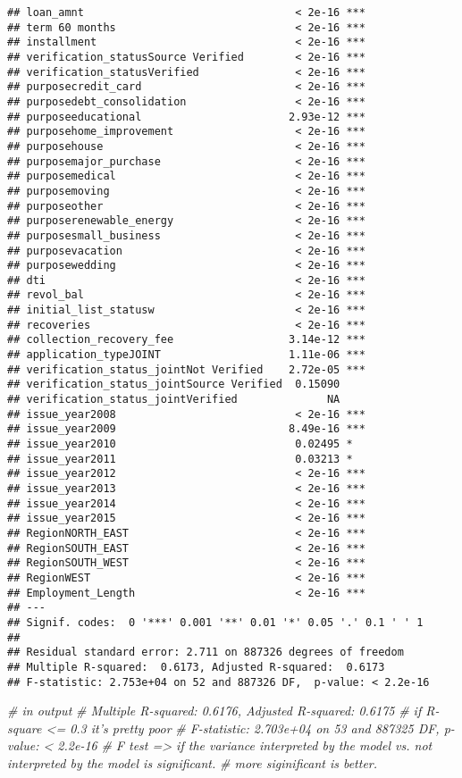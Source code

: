 \documentclass[]{article}
\newenvironment{Shaded}{\begin{snugshade}}{\end{snugshade}}
\newcommand{\CommentTok}[1]{\textcolor[rgb]{0.56,0.35,0.01}{\textit{#1}}}
\begin{document}
\begin{verbatim}
## loan_amnt                                 < 2e-16 ***
## term 60 months                            < 2e-16 ***
## installment                               < 2e-16 ***
## verification_statusSource Verified        < 2e-16 ***
## verification_statusVerified               < 2e-16 ***
## purposecredit_card                        < 2e-16 ***
## purposedebt_consolidation                 < 2e-16 ***
## purposeeducational                       2.93e-12 ***
## purposehome_improvement                   < 2e-16 ***
## purposehouse                              < 2e-16 ***
## purposemajor_purchase                     < 2e-16 ***
## purposemedical                            < 2e-16 ***
## purposemoving                             < 2e-16 ***
## purposeother                              < 2e-16 ***
## purposerenewable_energy                   < 2e-16 ***
## purposesmall_business                     < 2e-16 ***
## purposevacation                           < 2e-16 ***
## purposewedding                            < 2e-16 ***
## dti                                       < 2e-16 ***
## revol_bal                                 < 2e-16 ***
## initial_list_statusw                      < 2e-16 ***
## recoveries                                < 2e-16 ***
## collection_recovery_fee                  3.14e-12 ***
## application_typeJOINT                    1.11e-06 ***
## verification_status_jointNot Verified    2.72e-05 ***
## verification_status_jointSource Verified  0.15090    
## verification_status_jointVerified              NA    
## issue_year2008                            < 2e-16 ***
## issue_year2009                           8.49e-16 ***
## issue_year2010                            0.02495 *  
## issue_year2011                            0.03213 *  
## issue_year2012                            < 2e-16 ***
## issue_year2013                            < 2e-16 ***
## issue_year2014                            < 2e-16 ***
## issue_year2015                            < 2e-16 ***
## RegionNORTH_EAST                          < 2e-16 ***
## RegionSOUTH_EAST                          < 2e-16 ***
## RegionSOUTH_WEST                          < 2e-16 ***
## RegionWEST                                < 2e-16 ***
## Employment_Length                         < 2e-16 ***
## ---
## Signif. codes:  0 '***' 0.001 '**' 0.01 '*' 0.05 '.' 0.1 ' ' 1
## 
## Residual standard error: 2.711 on 887326 degrees of freedom
## Multiple R-squared:  0.6173, Adjusted R-squared:  0.6173 
## F-statistic: 2.753e+04 on 52 and 887326 DF,  p-value: < 2.2e-16
\end{verbatim}

\begin{Shaded}
\begin{Highlighting}[]
\CommentTok{# in output}
\CommentTok{# Multiple R-squared:  0.6176,  Adjusted R-squared:  0.6175 }
\CommentTok{# if R-square <= 0.3 it's pretty poor}
\CommentTok{# F-statistic: 2.703e+04 on 53 and 887325 DF,  p-value: < 2.2e-16}
\CommentTok{# F test => if the variance interpreted by the model vs. not interpreted by the model is significant. }
\CommentTok{# more siginificant is better. }
\end{Highlighting}
\end{Shaded}
\end{document}
